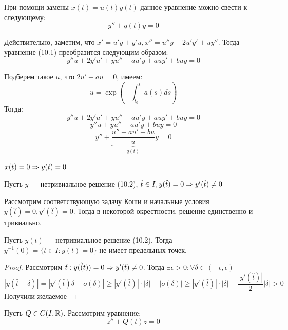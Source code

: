 При помощи замены \(x(t) = u(t)y(t)\) данное уравнение можно свести к следующему:
\begin{equation}
    y'' + q(t)y = 0
\end{equation}

Действительно, заметим, что \(x' = u'y + y'u, x'' = u''y + 2u'y' + uy''\). Тогда уравнение (10.1) преобразится следующим образом:
\[y''u + 2y'u' + yu'' + au'y + auy' + buy = 0\]

Подберем такое \(u\), что \(2u' + au = 0\), имеем:
\[u = \exp\left( -\int_{t_0}^t a(s)ds \right)\]
Тогда:
\[y''u + 2y'u' + yu'' + au'y + auy' + buy = 0\]
\[y''u + yu'' + au'y + buy = 0\]
\[y'' + \underbrace{\frac{u'' + au' + bu}{u}}_{q(t)}y = 0\]

\begin{note}
    \(x(t) = 0 \Rightarrow y(t) = 0\)
\end{note}
\begin{proposition}
    Пусть \(y\) --- нетривиальное решение (10.2), \(\hat{t} \in I, y(\hat{t}) = 0 \Rightarrow y'(\hat{t}) \ne 0\)
\end{proposition}
\begin{proposition}
    Рассмотрим соответствующую задачу Коши и начальные условия \(y(\hat{t}) = 0, y'(\hat{t}) = 0\). Тогда в некоторой окрестности, решение единственно и тривиально.
\end{proposition}

\begin{proposition}
    Пусть \(y(t)\) --- нетривиальное решение (10.2). Тогда \(y^{-1}(0) = \{t \in I: y(t) = 0\}\) не имеет предельных точек.
\end{proposition}
\begin{proof}
    Рассмотрим \(\hat{t}: y(\hat(t)) = 0 \Rightarrow y'(\hat{t}) \ne 0\). Тогда \(\exists \epsilon > 0: \forall \delta \in (-\epsilon, \epsilon)\)
    \[|y(\hat{t} + \delta)| = |y'(\hat{t})\delta + o(\delta)| \ge |y'(\hat{t})|\cdot|\delta| - |o(\delta)| \ge |y'(\hat{t})|\cdot|\delta| - \frac{|y'(\hat{t})|}{2}|\delta| > 0\]
    Получили желаемое
\end{proof}

Пусть \(Q \in C(I, \mathbb{R})\). Рассмотрим уравнение:
\begin{equation}
    z'' + Q(t)z = 0
\end{equation}

